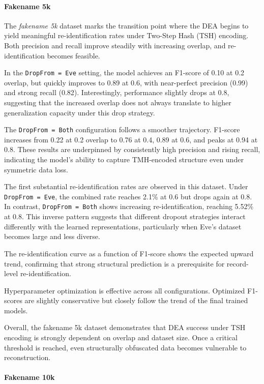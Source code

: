 \paragraph{Fakename 5k}

The \textit{fakename 5k} dataset marks the transition point where the DEA begins to yield meaningful re-identification rates under Two-Step Hash (TSH) encoding. Both precision and recall improve steadily with increasing overlap, and re-identification becomes feasible.

In the \texttt{DropFrom = Eve} setting, the model achieves an F1-score of 0.10 at 0.2 overlap, but quickly improves to 0.89 at 0.6, with near-perfect precision (0.99) and strong recall (0.82). Interestingly, performance slightly drops at 0.8, suggesting that the increased overlap does not always translate to higher generalization capacity under this drop strategy.

The \texttt{DropFrom = Both} configuration follows a smoother trajectory. F1-score increases from 0.22 at 0.2 overlap to 0.76 at 0.4, 0.89 at 0.6, and peaks at 0.94 at 0.8. These results are underpinned by consistently high precision and rising recall, indicating the model’s ability to capture TMH-encoded structure even under symmetric data loss.

The first substantial re-identification rates are observed in this dataset. Under \texttt{DropFrom = Eve}, the combined rate reaches 2.1\% at 0.6 but drops again at 0.8. In contrast, \texttt{DropFrom = Both} shows increasing re-identification, reaching 5.52\% at 0.8. This inverse pattern suggests that different dropout strategies interact differently with the learned representations, particularly when Eve's dataset becomes large and less diverse.

The re-identification curve as a function of F1-score shows the expected upward trend, confirming that strong structural prediction is a prerequisite for record-level re-identification.

Hyperparameter optimization is effective across all configurations. Optimized F1-scores are slightly conservative but closely follow the trend of the final trained models.

Overall, the fakename 5k dataset demonstrates that DEA success under TSH encoding is strongly dependent on overlap and dataset size. Once a critical threshold is reached, even structurally obfuscated data becomes vulnerable to reconstruction.



\paragraph{Fakename 10k}

